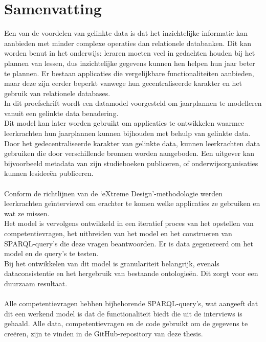 \chapter*{Samenvatting}
\noindent Een van de voordelen van gelinkte data is dat het inzichtelijke informatie kan aanbieden met minder complexe operaties dan relationele databanken.
Dit kan worden benut in het onderwijs: leraren moeten veel in gedachten houden bij het plannen van lessen, dus inzichtelijke gegevens kunnen hen helpen hun jaar beter te plannen.
Er bestaan applicaties die vergelijkbare functionaliteiten aanbieden, maar deze zijn eerder beperkt vanwege hun gecentraliseerde karakter en het gebruik van relationele databases.\\
In dit proefschrift wordt een datamodel voorgesteld om jaarplannen te modelleren vanuit een gelinkte data benadering.\\
Dit model kan later worden gebruikt om applicaties te ontwikkelen waarmee leerkrachten hun jaarplannen kunnen bijhouden met behulp van gelinkte data.\\
Door het gedecentraliseerde karakter van gelinkte data, kunnen leerkrachten data gebruiken die door verschillende bronnen worden aangeboden.
Een uitgever kan bijvoorbeeld metadata van zijn studieboeken publiceren, of onderwijsorganisaties kunnen lesideeën publiceren.\\ \\
Conform de richtlijnen van de `eXtreme Design'-methodologie werden leerkrachten geïnterviewd om erachter te komen welke applicaties ze gebruiken en wat ze missen.\\
Het model is vervolgens ontwikkeld in een iteratief proces van het opstellen van competentievragen, het uitbreiden van het model en het construeren van SPARQL-query's die deze vragen beantwoorden.
Er is data gegenereerd om het model en de query's te testen.\\
Bij het ontwikkelen van dit model is granulariteit belangrijk, evenals dataconsistentie en het hergebruik van bestaande ontologieën. Dit zorgt voor een duurzaam resultaat.\\ \\
Alle competentievragen hebben bijbehorende SPARQL-query's, wat aangeeft dat dit een werkend model is dat de functionaliteit biedt die uit de interviews is gehaald.
Alle data, competentievragen en de code gebruikt om de gegevens te creëren, zijn te vinden in de GitHub-repository van deze thesis.